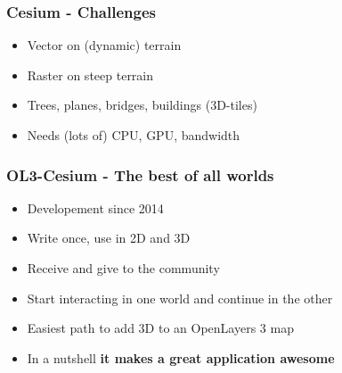 \documentclass[handout]{beamer}
\begin{document}
  \begin{frame}
    \frametitle{Cesium - Challenges}
    \begin{itemize}
      \item Vector on (dynamic) terrain
      \item Raster on steep terrain
      \item Trees, planes, bridges, buildings (3D-tiles)
      \item Needs (lots of) CPU, GPU, bandwidth
    \end{itemize}

   \end{frame}


  \begin{frame}
    \frametitle{OL3-Cesium - The best of all worlds}
    \begin{itemize}
      \item Developement since 2014
      \item Write once, use in 2D and 3D
      \item Receive and give to the community
      \item Start interacting in one world and continue in the other
      \item Easiest path to add 3D to an OpenLayers 3 map
      \item In a nutshell \textbf{it makes a great application awesome}
    \end{itemize}
  \end{frame}
\end{document}
